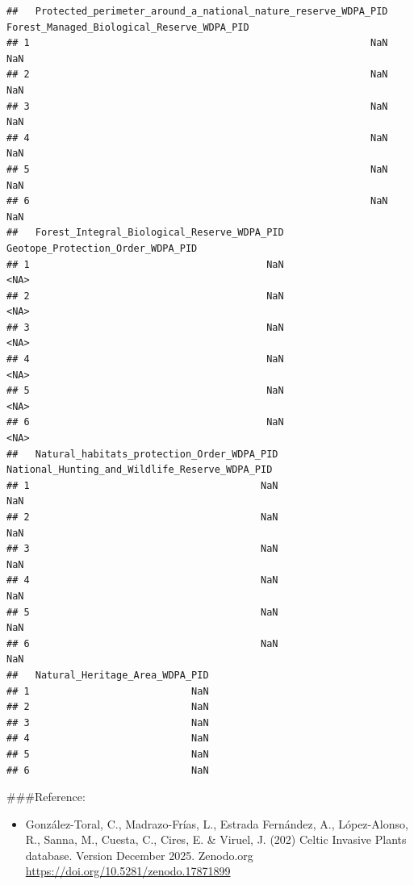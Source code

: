 \documentclass[
]{article}
\providecommand{\tightlist}{%
  \setlength{\itemsep}{0pt}\setlength{\parskip}{0pt}}
\begin{document}
\begin{verbatim}
##   Protected_perimeter_around_a_national_nature_reserve_WDPA_PID Forest_Managed_Biological_Reserve_WDPA_PID
## 1                                                           NaN                                        NaN
## 2                                                           NaN                                        NaN
## 3                                                           NaN                                        NaN
## 4                                                           NaN                                        NaN
## 5                                                           NaN                                        NaN
## 6                                                           NaN                                        NaN
##   Forest_Integral_Biological_Reserve_WDPA_PID Geotope_Protection_Order_WDPA_PID
## 1                                         NaN                              <NA>
## 2                                         NaN                              <NA>
## 3                                         NaN                              <NA>
## 4                                         NaN                              <NA>
## 5                                         NaN                              <NA>
## 6                                         NaN                              <NA>
##   Natural_habitats_protection_Order_WDPA_PID National_Hunting_and_Wildlife_Reserve_WDPA_PID
## 1                                        NaN                                            NaN
## 2                                        NaN                                            NaN
## 3                                        NaN                                            NaN
## 4                                        NaN                                            NaN
## 5                                        NaN                                            NaN
## 6                                        NaN                                            NaN
##   Natural_Heritage_Area_WDPA_PID
## 1                            NaN
## 2                            NaN
## 3                            NaN
## 4                            NaN
## 5                            NaN
## 6                            NaN
\end{verbatim}

\#\#\#Reference:

\begin{itemize}
\tightlist
\item
  González-Toral, C., Madrazo-Frías, L., Estrada Fernández, A.,
  López-Alonso, R., Sanna, M., Cuesta, C., Cires, E. \& Viruel, J. (202)
  Celtic Invasive Plants database. Version December 2025. Zenodo.org
  \url{https://doi.org/10.5281/zenodo.17871899}
\end{itemize}
\end{document}
